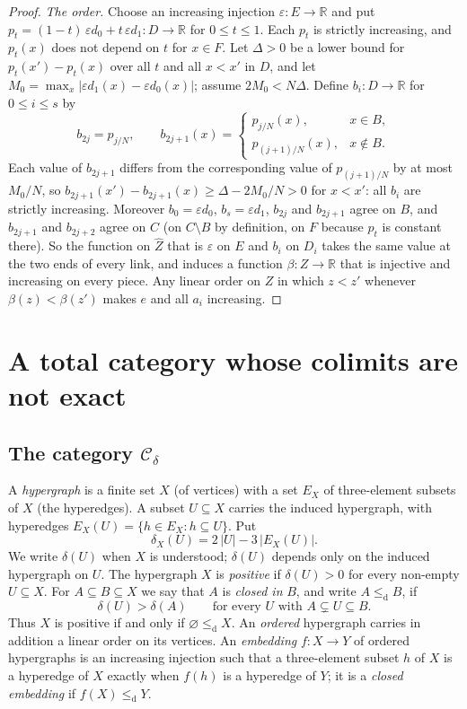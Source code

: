 \documentclass[11pt,a4paper]{article}
\theoremstyle{definition}
\newcommand{\Cd}{\mathcal{C}_{\delta}}
\newcommand{\cle}{\leq_{\mathrm{d}}}
\newcommand{\R}{\mathbb{R}}
\begin{document}
\begin{proof}
\emph{The order.} Choose an increasing injection $\varepsilon\colon E\to\R$
and put $p_t=(1-t)\,\varepsilon d_0+t\,\varepsilon d_1\colon D\to\R$ for
$0\le t\le 1$. Each $p_t$ is strictly increasing, and $p_t(x)$ does not
depend on $t$ for $x\in F$. Let $\Delta>0$ be a lower bound for
$p_t(x')-p_t(x)$ over all $t$ and all $x<x'$ in $D$, and let
$M_0=\max_x|\varepsilon d_1(x)-\varepsilon d_0(x)|$; assume $2M_0<N\Delta$.
Define $b_i\colon D\to\R$ for $0\le i\le s$ by
\[
 b_{2j}=p_{j/N},\qquad
 b_{2j+1}(x)=\begin{cases}p_{j/N}(x),&x\in B,\\ p_{(j+1)/N}(x),&x\notin B.\end{cases}
\]
Each value of $b_{2j+1}$ differs from the corresponding value of $p_{(j+1)/N}$
by at most $M_0/N$, so $b_{2j+1}(x')-b_{2j+1}(x)\ge\Delta-2M_0/N>0$ for
$x<x'$: all $b_i$ are strictly increasing. Moreover $b_0=\varepsilon d_0$,
$b_s=\varepsilon d_1$, $b_{2j}$ and $b_{2j+1}$ agree on $B$, and $b_{2j+1}$
and $b_{2j+2}$ agree on $C$ (on $C\setminus B$ by definition, on $F$ because
$p_t$ is constant there). So the function on $\widehat Z$ that is
$\varepsilon$ on $E$ and $b_i$ on $D_i$ takes the same value at the two ends
of every link, and induces a function $\beta\colon Z\to\R$ that is injective
and increasing on every piece. Any linear order on $Z$ in which $z<z'$
whenever $\beta(z)<\beta(z')$ makes $e$ and all $a_i$ increasing.
\end{proof}
\section{A total category whose colimits are not exact}\label{sec:cdelta}

\subsection{The category $\Cd$}

A \emph{hypergraph} is a finite set $X$ (of vertices) with a set $E_X$ of
three-element subsets of $X$ (the hyperedges). A subset $U\subseteq X$
carries the induced hypergraph, with hyperedges
$E_X(U)=\{h\in E_X: h\subseteq U\}$. Put
\[
 \delta_X(U)=2\,|U|-3\,|E_X(U)| .
\]
We write $\delta(U)$ when $X$ is understood; $\delta(U)$ depends only on the
induced hypergraph on $U$. The hypergraph $X$ is \emph{positive} if
$\delta(U)>0$ for every non-empty $U\subseteq X$. For $A\subseteq B\subseteq X$
we say that $A$ is \emph{closed in} $B$, and write $A\cle B$, if
\[
 \delta(U)>\delta(A)\qquad\text{for every } U \text{ with } A\subsetneq U\subseteq B .
\]
Thus $X$ is positive if and only if $\varnothing\cle X$. An \emph{ordered}
hypergraph carries in addition a linear order on its vertices. An
\emph{embedding} $f\colon X\to Y$ of ordered hypergraphs is an increasing
injection such that a three-element subset $h$ of $X$ is a hyperedge of $X$
exactly when $f(h)$ is a hyperedge of $Y$; it is a \emph{closed embedding} if
$f(X)\cle Y$.
\end{document}
